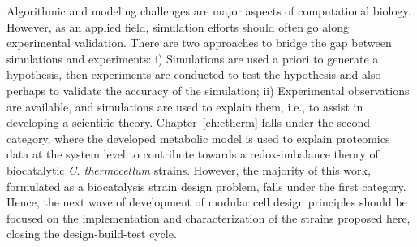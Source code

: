 
Algorithmic and modeling challenges are major aspects of computational biology.
However, as an applied field, simulation efforts should often go along experimental validation.
There are two approaches to bridge the gap between simulations and experiments:
i) Simulations are used a priori to generate a hypothesis, then experiments are conducted to test the hypothesis and also perhaps to validate the accuracy of the simulation;
ii) Experimental observations are available, and simulations are used to explain them, i.e., to assist in developing a scientific theory.
Chapter~\ref{ch:ctherm} falls under the second category, where the developed metabolic model is used to explain proteomics data at the system level to contribute towards a redox-imbalance theory of biocatalytic \textit{C. thermocellum} strains. %
However, the majority of this work, formulated as a biocatalysis strain design problem, falls under the first category.
Hence, the next wave of development of modular cell design principles should be focused on the implementation and characterization of the strains proposed here, closing the design-build-test cycle.




